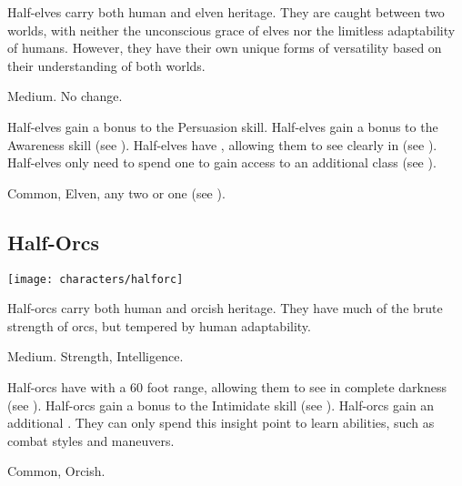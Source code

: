         Half-elves carry both human and elven heritage.
        They are caught between two worlds, with neither the unconscious grace of elves nor the limitless adaptability of humans.
        However, they have their own unique forms of versatility based on their understanding of both worlds.

         Medium.
         No change.
        \begin{raggeditemize}
             Half-elves gain a  bonus to the Persuasion skill.
             Half-elves gain a  bonus to the Awareness skill (see ).
             Half-elves have , allowing them to see clearly in  (see ).
             Half-elves only need to spend one  to gain access to an additional class (see ).
        \end{raggeditemize}
         Common, Elven, any two  or one  (see ).

    \subsection{Half-Orcs}
        \texttt{[image: characters/halforc]}

        Half-orcs carry both human and orcish heritage.
        They have much of the brute strength of orcs, but tempered by human adaptability.

         Medium.
          Strength,  Intelligence.
        \begin{raggeditemize}
             Half-orcs have  with a 60 foot range, allowing them to see in complete darkness (see ).
             Half-orcs gain a  bonus to the Intimidate skill (see ).
             Half-orcs gain an additional .
                They can only spend this insight point to learn  abilities, such as combat styles and maneuvers.
        \end{raggeditemize}
         Common, Orcish.

